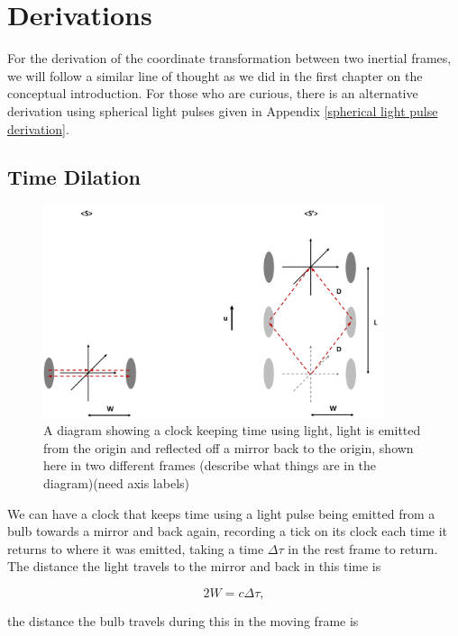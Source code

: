 \section{Derivations}%
For the derivation of the coordinate transformation between two inertial frames, we will follow a similar line of thought as we did in the first chapter on the conceptual introduction. For those who are curious, there is an alternative derivation using spherical light pulses given in Appendix \ref{spherical light pulse derivation}.


\subsection{Time Dilation}

\begin{figure}[ht]
	\centering
	\includegraphics[width=10cm]{images/pdf/Light_clock.pdf}
	\caption{A diagram showing a clock keeping time using light, light is emitted from the origin and reflected off a mirror back to the origin, shown here in two different frames (describe what things are in the diagram)(need axis labels)}
	\label{fig: light clock}
\end{figure}

We can have a clock that keeps time using a light pulse being emitted from a bulb towards a mirror and back again, recording a tick on its clock each time it returns to where it was emitted, taking a time $\Delta \tau$ in the rest frame to return. The distance the light travels to the mirror and back in this time is

\begin{equation}
	2W=c\Delta \tau,
\end{equation}

the distance the bulb travels during this in the moving frame is

